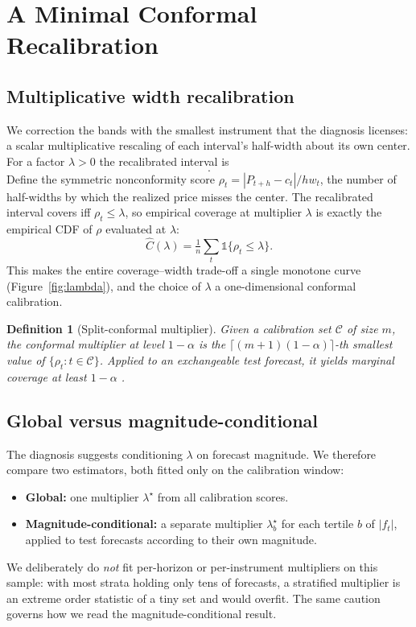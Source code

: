 \documentclass[11pt,a4paper]{article}
\newtheorem{definition}{Definition}
\begin{document}
\section{A Minimal Conformal Recalibration}\label{sec:method}
\subsection{Multiplicative width recalibration}
We correction the bands with the smallest instrument that the diagnosis licenses: a scalar
multiplicative rescaling of each interval's half-width about its own center. For a
factor $\lambda>0$ the recalibrated interval is
\begin{equation}
[\,c_t - \lambda\,\mathit{hw}_t,\; c_t + \lambda\,\mathit{hw}_t\,].
\end{equation}
Define the symmetric nonconformity score
$\rho_t = |P_{t+h}-c_t| / \mathit{hw}_t$, the number of half-widths by which the
realized price misses the center. The recalibrated interval covers iff
$\rho_t \le \lambda$, so empirical coverage at multiplier $\lambda$ is exactly the
empirical CDF of $\rho$ evaluated at $\lambda$:
\begin{equation}
\widehat{C}(\lambda) = \tfrac1n\textstyle\sum_t \mathbb{1}\{\rho_t \le \lambda\}.
\end{equation}
This makes the entire coverage--width trade-off a single monotone curve
(Figure~\ref{fig:lambda}), and the choice of $\lambda$ a one-dimensional conformal
calibration.

\begin{definition}[Split-conformal multiplier]
Given a calibration set $\mathcal{C}$ of size $m$, the conformal multiplier at level
$1-\alpha$ is the $\lceil (m+1)(1-\alpha)\rceil$-th smallest value of
$\{\rho_t : t\in\mathcal{C}\}$. Applied to an exchangeable test forecast, it yields
marginal coverage at least $1-\alpha$ \cite{vovk2005,romano2019}.
\end{definition}

\subsection{Global versus magnitude-conditional}
The diagnosis suggests conditioning $\lambda$ on forecast magnitude. We therefore
compare two estimators, both fitted only on the calibration window:
\begin{itemize}[leftmargin=1.4em,itemsep=1pt]
\item \textbf{Global:} one multiplier $\lambda^\star$ from all calibration scores.
\item \textbf{Magnitude-conditional:} a separate multiplier $\lambda^\star_b$ for each
tertile $b$ of $|f_t|$, applied to test forecasts according to their own magnitude.
\end{itemize}
We deliberately do \emph{not} fit per-horizon or per-instrument multipliers on this
sample: with most strata holding only tens of forecasts, a stratified multiplier is an
extreme order statistic of a tiny set and would overfit. The same caution governs how
we read the magnitude-conditional result.
\end{document}
